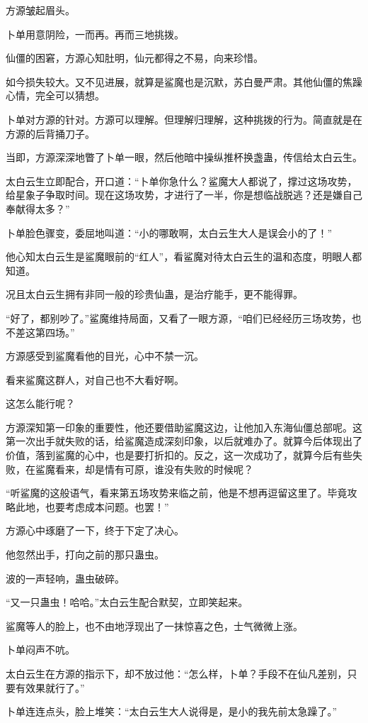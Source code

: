 \begin{this_body}
方源皱起眉头。

卜单用意阴险，一而再。再而三地挑拨。

仙僵的困窘，方源心知肚明，仙元都得之不易，向来珍惜。

如今损失较大。又不见进展，就算是鲨魔也是沉默，苏白曼严肃。其他仙僵的焦躁心情，完全可以猜想。

卜单对方源的针对。方源可以理解。但理解归理解，这种挑拨的行为。简直就是在方源的后背捅刀子。

当即，方源深深地瞥了卜单一眼，然后他暗中操纵推杯换盏蛊，传信给太白云生。

太白云生立即配合，开口道：“卜单你急什么？鲨魔大人都说了，撑过这场攻势，给星象子争取时间。现在这场攻势，才进行了一半，你是想临战脱逃？还是嫌自己奉献得太多？”

卜单脸色骤变，委屈地叫道：“小的哪敢啊，太白云生大人是误会小的了！”

他心知太白云生是鲨魔眼前的“红人”，看鲨魔对待太白云生的温和态度，明眼人都知道。

况且太白云生拥有非同一般的珍贵仙蛊，是治疗能手，更不能得罪。

“好了，都别吵了。”鲨魔维持局面，又看了一眼方源，“咱们已经经历三场攻势，也不差这第四场。”

方源感受到鲨魔看他的目光，心中不禁一沉。

看来鲨魔这群人，对自己也不大看好啊。

这怎么能行呢？

方源深知第一印象的重要性，他还要借助鲨魔这边，让他加入东海仙僵总部呢。这第一次出手就失败的话，给鲨魔造成深刻印象，以后就难办了。就算今后体现出了价值，落到鲨魔的心中，也是要打折扣的。反之，这一次成功了，就算今后有些失败，在鲨魔看来，却是情有可原，谁没有失败的时候呢？

“听鲨魔的这般语气，看来第五场攻势来临之前，他是不想再逗留这里了。毕竟攻略此地，也要考虑成本问题。也罢！”

方源心中琢磨了一下，终于下定了决心。

他忽然出手，打向之前的那只蛊虫。

波的一声轻响，蛊虫破碎。

“又一只蛊虫！哈哈。”太白云生配合默契，立即笑起来。

鲨魔等人的脸上，也不由地浮现出了一抹惊喜之色，士气微微上涨。

卜单闷声不吭。

太白云生在方源的指示下，却不放过他：“怎么样，卜单？手段不在仙凡差别，只要有效果就行了。”

卜单连连点头，脸上堆笑：“太白云生大人说得是，是小的我先前太急躁了。”


\end{this_body}
